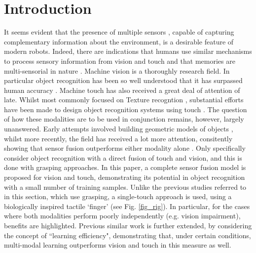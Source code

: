 \documentclass[letterpaper, 10 pt, conference]{ieeeconf}  %
\begin{document}
\section{Introduction}
It seems evident that the presence of multiple sensors \cite{Kim2004,Gorges2010}, capable of capturing complementary information about the environment, is a desirable feature of modern robots. Indeed, there are indications that humans use similar mechanisms to process sensory information from vision and touch and that memories are multi-sensorial in nature \cite{Lacey2007,Vasconcelos2011,Lacey2014}.
Machine vision is a thoroughly research field. In particular object recognition has been so well understood that it has surpassed human accuracy \cite{He2015}.
Machine touch has also received a great deal of attention of late. Whilst most commonly focused on Texture recogntion \cite{Decherchi2011,Jamali2011,Liu2012,Sinapov2011}, substantial efforts have been made to design object recognition systems using touch \cite{Navarro2012,Soh2012,Madry2014}. 
The question of how these modalities are to be used in conjunction remains, however, largely unanswered. Early attempts involved building geometric models of objects \cite{Allen1988}, whilst more recently, the field has received a lot more attention, consitently showing that sensor fusion outperforms either modality alone \cite{Kim2004,Ilonen2013,Guler2014,Yang2015}. Only \cite{Kim2004,Yang2015} specifically consider object recognition with a direct fusion of touch and vision, and this is done with grasping approaches. 
In this paper, a complete sensor fusion model is proposed for vision and touch, demonstrating its potential in object recognition with a small number of training samples. Unlike the previous studies referred to in this section, which use grasping, a single-touch approach is used, using a biologically inspired tactile `finger' (see Fig. \ref{fig_rig}). In particular, for the cases where both modalities perform poorly independently (e.g. vision impairment), benefits are highlighted. Previous similar work \cite{Yang2015} is further extended, by considering the concept of ``learning efficiency", demonstrating that, under certain conditions, multi-modal learning outperforms vision and touch in this measure as well.

\begin{figure}
\centering
{}	
\end{figure}
\end{document}
